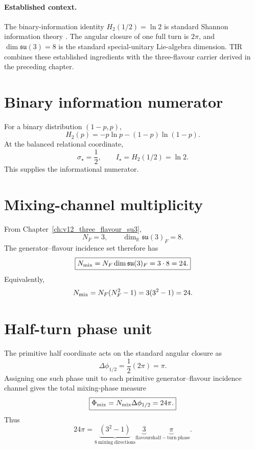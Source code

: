 \paragraph{Established context.}
The binary-information identity $H_2(1/2)=\ln2$ is standard Shannon
information theory \cite{shannon1948,CoverThomas2006}.  The angular closure of
one full turn is $2\pi$, and $\dim\mathfrak{su}(3)=8$ is the standard
special-unitary Lie-algebra dimension.  TIR combines these established
ingredients with the three-flavour carrier derived in the preceding chapter.


\section{Binary information numerator}
For a binary distribution $(1-p,p)$,
\[
H_2(p)=-p\ln p-(1-p)\ln(1-p).
\]
At the balanced relational coordinate,
\begin{equation}
\boxed{
\sigma_\star=\frac12,
\qquad
I_\star=H_2(1/2)=\ln2.
}
\label{eq:v12-kappa-binary-information}
\end{equation}
This supplies the informational numerator.

\section{Mixing-channel multiplicity}
From Chapter~\ref{ch:v12_three_flavour_su3},
\[
N_F=3,
\qquad
\dim_{\mathbb R}\mathfrak{su}(3)_F=8.
\]
The generator--flavour incidence set therefore has
\begin{equation}
\boxed{
N_{\rm mix}
=N_F\dim\mathfrak{su}(3)_F
=3\cdot8
=24.
}
\label{eq:v12-kappa-mixing-count}
\end{equation}
Equivalently,
\[
N_{\rm mix}
=N_F(N_F^2-1)
=3(3^2-1)
=24.
\]

\section{Half-turn phase unit}
The primitive half coordinate acts on the standard angular closure as
\begin{equation}
\boxed{
\Delta\phi_{1/2}
=\frac12(2\pi)
=\pi.
}
\label{eq:v12-kappa-half-turn}
\end{equation}
Assigning one such phase unit to each primitive generator--flavour incidence
channel gives the total mixing-phase measure
\begin{equation}
\boxed{
\Phi_{\rm mix}
=N_{\rm mix}\Delta\phi_{1/2}
=24\pi.
}
\label{eq:v12-kappa-mixing-phase-measure}
\end{equation}
Thus
\begin{equation}
\boxed{
24\pi
=\underbrace{(3^2-1)}_{8\ \mathrm{mixing\ directions}}
\underbrace{3}_{\mathrm{flavours}}
\underbrace{\pi}_{\mathrm{half\!\!-turn\ phase}}.
}
\label{eq:v12-kappa-denominator-factorization}
\end{equation}

